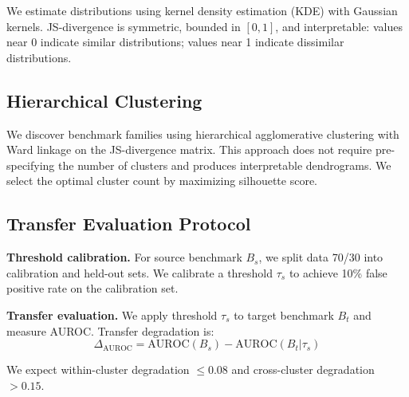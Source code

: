 We estimate distributions using kernel density estimation (KDE) with Gaussian kernels. JS-divergence is symmetric, bounded in $[0, 1]$, and interpretable: values near 0 indicate similar distributions; values near 1 indicate dissimilar distributions.

\subsection{Hierarchical Clustering}

We discover benchmark families using hierarchical agglomerative clustering with Ward linkage on the JS-divergence matrix. This approach does not require pre-specifying the number of clusters and produces interpretable dendrograms. We select the optimal cluster count by maximizing silhouette score.

\subsection{Transfer Evaluation Protocol}

\textbf{Threshold calibration.} For source benchmark $B_s$, we split data 70/30 into calibration and held-out sets. We calibrate a threshold $\tau_s$ to achieve 10\% false positive rate on the calibration set.

\textbf{Transfer evaluation.} We apply threshold $\tau_s$ to target benchmark $B_t$ and measure AUROC. Transfer degradation is:
\begin{equation}
\Delta_{\text{AUROC}} = \text{AUROC}(B_s) - \text{AUROC}(B_t | \tau_s)
\end{equation}

We expect within-cluster degradation $\leq 0.08$ and cross-cluster degradation $> 0.15$.

